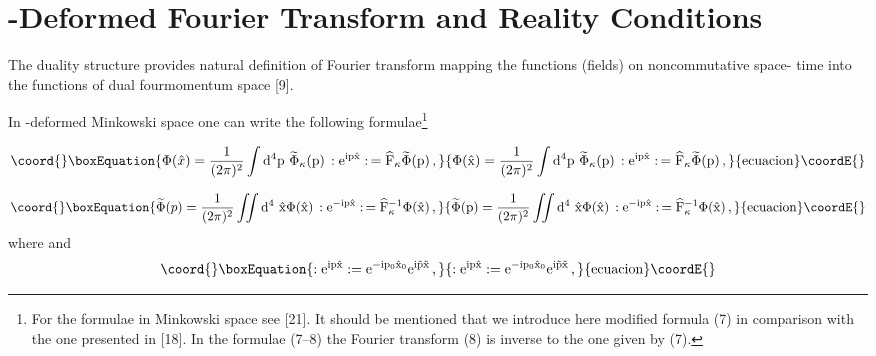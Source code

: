 \documentclass[a4paper,a4paper]{article}
\providecommand\E{\rm e}
\providecommand\D{\rm d }
\begin{document}
\section{\myHighlight{$\kappa$}\coordHE{}-Deformed Fourier Transform and Reality 
Conditions}
The duality structure provides natural definition of Fourier
transform mapping the functions (fields) on noncommutative space-
time
\coordHE{} into the functions of dual fourmomentum space [9].



In \myHighlight{$\kappa$}\coordHE{}-deformed Minkowski space one can write the following 
formulae\footnote{For the formulae in \coordHE{} Minkowski space see 
[21]. It
  should be mentioned that we introduce here modified
formula (7) in comparison with the one presented in [18]. In
the formulae (7--8) the Fourier transform (8) is inverse to
the  one given by (7).}

\begin{equation}\coord{}\boxEquation{
\Phi(\hat{x}) =
{1\over (2\pi)^{2}} \int \D^4 p\  \widetilde{\Phi}_{\kappa}
(p)\, : \E^{ip\hat{x}}:\, = \widehat{F}_{\kappa}
\widetilde{\Phi}(p)\, ,
}{
\Phi(\hat{x}) =
{1\over (2\pi)^{2}} \int \D^4 p\  \widetilde{\Phi}_{\kappa}
(p)\, : \E^{ip\hat{x}}:\, = \widehat{F}_{\kappa}
\widetilde{\Phi}(p)\, ,
}{ecuacion}\coordE{}\end{equation}

\begin{equation}\coord{}\boxEquation{
{\widetilde{\Phi}} (p) =
{1\over (2\pi)^{2}} 
 \int\!\!\!\int \D^4\  {\hat{x}}
 {\Phi} ({\hat{x}} ) 
\, : \E^{-ip\hat{x}}:\, = \widehat{F}_{\kappa}^{-1}
{\Phi}({\hat{x}})\, ,
}{
{\widetilde{\Phi}} (p) =
{1\over (2\pi)^{2}} 
 \int\!\!\!\int \D^4\  {\hat{x}}
 {\Phi} ({\hat{x}} ) 
\, : \E^{-ip\hat{x}}:\, = \widehat{F}_{\kappa}^{-1}
{\Phi}({\hat{x}})\, ,
}{ecuacion}\coordE{}\end{equation}
where \coordHE{} and
\begin{equation}\coord{}\boxEquation{
 : \E^{ip\hat{x}}: =   \E^{- ip_{0}\hat{x}_{0}}
   \E^{i\vec{p}\vec{x}}\, ,
}{
 : \E^{ip\hat{x}}: =   \E^{- ip_{0}\hat{x}_{0}}
   \E^{i\vec{p}\vec{x}}\, ,
}{ecuacion}\coordE{}\end{equation}
\end{document}

